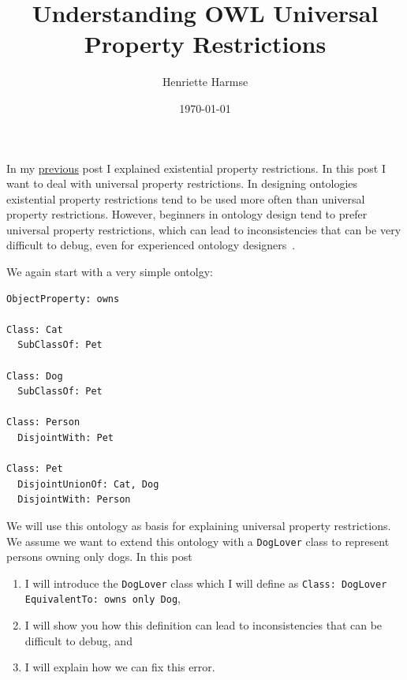 \documentclass{amsart}
\title{Understanding OWL Universal Property Restrictions}
\author{Henriette Harmse}
\date{\today}
\begin{document}
  \maketitle
  
  In my \href{https://henrietteharmse.com/2018/04/26/understanding-owl-existential-property-restrictions/}{previous} post I explained existential property restrictions. In this post I want to deal with universal property restrictions. In designing ontologies existential property restrictions tend to be used more often than universal property restrictions. However, beginners in ontology design tend to prefer universal property restrictions, which can lead to inconsistencies that can be very difficult to debug, even for experienced ontology designers~\cite{Horridge2011,Horridge2013}.
  
  We again start with a very simple ontolgy:  
\begin{small}
\begin{verbatim} 
ObjectProperty: owns
        
Class: Cat
  SubClassOf: Pet
    
Class: Dog
  SubClassOf: Pet
    
Class: Person
  DisjointWith: Pet
        
Class: Pet
  DisjointUnionOf: Cat, Dog
  DisjointWith: Person   
\end{verbatim}
\end{small}  

We will use this ontology as basis for explaining universal property restrictions. We assume we want to extend this ontology with a \texttt{DogLover} class to represent persons owning only dogs. In this post
  \begin{enumerate}
   \item I will introduce the \texttt{DogLover} class which I will define as \texttt{Class: DogLover EquivalentTo: owns only Dog},
   \item I will show you how this definition can lead to inconsistencies that can be difficult to debug, and
   \item I will explain how we can fix this error.
   \end{enumerate}
\end{document}
